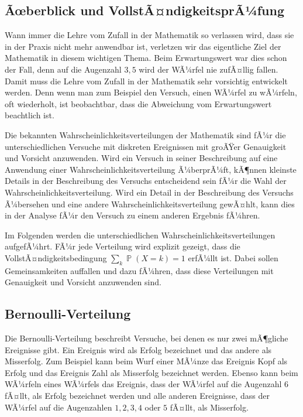 ﻿\documentclass[12pt,a4paper]{article}
\theoremstyle{definition}
\theoremstyle{plain}
\theoremstyle{remark}
\DeclareMathOperator{\Prob}{\mathbb{P}}
\begin{document}
\subsection{Ãœberblick und VollstÃ¤ndigkeitsprÃ¼fung}

Wann immer die Lehre vom Zufall in der Mathematik so verlassen wird, dass sie
in der Praxis nicht mehr anwendbar ist, verletzen wir das eigentliche Ziel der
Mathematik in diesem wichtigen Thema. Beim Erwartungswert war dies schon der
Fall, denn auf die Augenzahl $3{,}5$ wird der WÃ¼rfel nie zufÃ¤llig fallen.
Damit muss die Lehre vom Zufall in der Mathematik sehr vorsichtig entwickelt
werden. Denn wenn man zum Beispiel den Versuch, einen WÃ¼rfel zu wÃ¼rfeln, oft
wiederholt, ist beobachtbar, dass die Abweichung vom Erwartungswert beachtlich
ist.

Die bekannten Wahrscheinlichkeitsverteilungen der Mathematik sind fÃ¼r die
unterschiedlichen Versuche mit diskreten Ereignissen mit groÃŸer Genauigkeit
und Vorsicht anzuwenden. Wird ein Versuch in seiner Beschreibung auf eine
Anwendung einer Wahrscheinlichkeitsverteilung Ã¼berprÃ¼ft, kÃ¶nnen kleinste
Details in der Beschreibung des Versuchs entscheidend sein fÃ¼r die Wahl der
Wahrscheinlichkeitsverteilung. Wird ein Detail in der Beschreibung des
Versuchs Ã¼bersehen und eine andere Wahrscheinlichkeitsverteilung gewÃ¤hlt,
kann dies in der Analyse fÃ¼r den Versuch zu einem anderen Ergebnis fÃ¼hren.

Im Folgenden werden die unterschiedlichen Wahrscheinlichkeitsverteilungen
aufgefÃ¼hrt. FÃ¼r jede Verteilung wird explizit gezeigt, dass die
VollstÃ¤ndigkeitsbedingung $\sum_k \Prob(X=k) = 1$ erfÃ¼llt ist. Dabei sollen
Gemeinsamkeiten auffallen und dazu fÃ¼hren, dass diese Verteilungen mit
Genauigkeit und Vorsicht anzuwenden sind.

\subsection{Bernoulli-Verteilung}

Die Bernoulli-Verteilung beschreibt Versuche, bei denen es nur zwei mÃ¶gliche
Ereignisse gibt. Ein Ereignis wird als Erfolg bezeichnet und das andere als
Misserfolg. Zum Beispiel kann beim Wurf einer MÃ¼nze das Ereignis Kopf als
Erfolg und das Ereignis Zahl als Misserfolg bezeichnet werden. Ebenso kann
beim WÃ¼rfeln eines WÃ¼rfels das Ereignis, dass der WÃ¼rfel auf die Augenzahl
$6$ fÃ¤llt, als Erfolg bezeichnet werden und alle anderen Ereignisse, dass der
WÃ¼rfel auf die Augenzahlen $1, 2, 3, 4$ oder $5$ fÃ¤llt, als Misserfolg.
\end{document}
